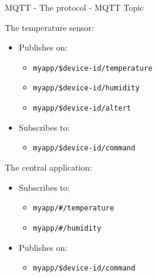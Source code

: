 \begin{frame}[fragile]{MQTT - The protocol - MQTT Topic}
\protect\hypertarget{mqtt---the-protocol---mqtt-topic-1}{}

The temperature sensor:

\begin{itemize}
\tightlist
\item
  Publishes on:

  \begin{itemize}
  \tightlist
  \item
    \texttt{myapp/\$device-id/temperature}
  \item
    \texttt{myapp/\$device-id/humidity}
  \item
    \texttt{myapp/\$device-id/altert}
  \end{itemize}
\item
  Subscribes to:

  \begin{itemize}
  \tightlist
  \item
    \texttt{myapp/\$device-id/command}
  \end{itemize}
\end{itemize}

The central application:

\begin{itemize}
\tightlist
\item
  Subscribes to:

  \begin{itemize}
  \tightlist
  \item
    \texttt{myapp/\#/temperature}
  \item
    \texttt{myapp/\#/humidity}
  \end{itemize}
\item
  Publishes on:

  \begin{itemize}
  \tightlist
  \item
    \texttt{myapp/\$device-id/command}
  \end{itemize}
\end{itemize}


\end{frame}

